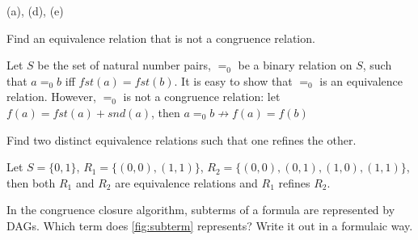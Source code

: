 \documentclass[11pt,a4paper]{article}
\begin{document}
\begin{solution}
    (a), (d), (e)
\end{solution}

\subproblem Find an equivalence relation that is not a congruence relation.

\begin{solution}
    Let $S$ be the set of natural number pairs, $=_0$ be a binary relation on $S$, such that $a =_0 b$ iff $fst(a) = fst(b)$. It is easy to show that $=_0$ is an equivalence relation. However, $=_0$ is not a congruence relation: let $f(a) = fst(a) + snd(a)$, then $a =_0 b \not\to f(a) = f(b)$
\end{solution}

\subproblem Find two distinct equivalence relations such that one refines the other.

\begin{solution}
    Let $S = \{0, 1\}$, $R_1 = \{(0, 0), (1, 1)\}$, $R_2 = \{(0, 0), (0, 1), (1, 0), (1, 1)\}$, then both $R_1$ and $R_2$ are equivalence relations and $R_1$ refines $R_2$. 
\end{solution}

\subproblem In the congruence closure algorithm, subterms of a formula are represented by DAGs.
Which term does \cref{fig:subterm} represents?
Write it out in a formulaic way.
\end{document}
